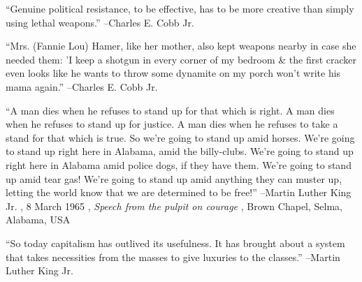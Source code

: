 \documentclass{article}%
\begin{document}
\linebreak%
\vspace{1mm}%
\begin{minipage}{\textwidth}%
\flushleft%
“Genuine political resistance, to be effective, has to be more creative than simply using lethal weapons.”%
\linebreak%
\vspace{1mm}%
–Charles E. Cobb Jr.%
\linebreak%
\vspace{1mm}%
\end{minipage}%
\linebreak%
\vspace{1mm}%
\begin{minipage}{\textwidth}%
\flushleft%
“Mrs. (Fannie Lou) Hamer, like her mother, also kept weapons nearby in case she needed them: 'I keep a shotgun in every corner of my bedroom \& the first cracker even looks like he wants to throw some dynamite on my porch won't write his mama again.”%
\linebreak%
\vspace{1mm}%
–Charles E. Cobb Jr.%
\linebreak%
\vspace{1mm}%
\end{minipage}%
\linebreak%
\vspace{1mm}%
\begin{minipage}{\textwidth}%
\flushleft%
“A man dies when he refuses to stand up for that which is right. A man dies when he refuses to stand up for justice. A man dies when he refuses to take a stand for that which is true. So we're going to stand up amid horses. We're going to stand up right here in Alabama, amid the billy{-}clubs. We're going to stand up right here in Alabama amid police dogs, if they have them. We're going to stand up amid tear gas! We're going to stand up amid anything they can muster up, letting the world know that we are determined to be free!”%
\linebreak%
\vspace{1mm}%
–Martin Luther King Jr.%
, 8 March 1965%
, \textit{Speech from the pulpit on courage}%
, Brown Chapel, Selma, Alabama, USA%
\linebreak%
\vspace{1mm}%
\end{minipage}%
\linebreak%
\vspace{1mm}%
\begin{minipage}{\textwidth}%
\flushleft%
“So today capitalism has outlived its usefulness. It has brought about a system that takes necessities from the masses to give luxuries to the classes.”%
\linebreak%
\vspace{1mm}%
–Martin Luther King Jr.%
\linebreak%
\vspace{1mm}%
\end{minipage}%
\end{document}
